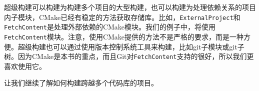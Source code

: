 超级构建可以构建为构建多个项目的大型构建，也可以构建为处理依赖关系的项目内子模块，CMake已经有稳定的方法获取存储库。比如，\texttt{ExternalProject}和\texttt{FetchContent}是处理外部依赖的CMake模块。我们的例子中，将使用\texttt{FetchContent}模块。注意，使用CMake提供的方法不是严格的要求，而是一种方便。超级构建也可以通过使用版本控制系统工具来构建，比如git子模块或git子树。因为CMake是本书的重点，而且Git对\texttt{FetchContent}支持的很好，所以我们更喜欢使用它。

让我们继续了解如何构建跨越多个代码库的项目。